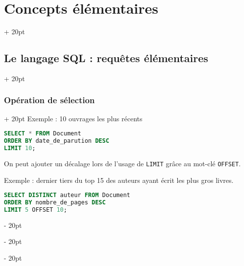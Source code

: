 \documentclass[a4paper, 12pt, twoside]{article}
\newcommand{\ind}[1][20pt]{\advance\leftskip + #1}
\newcommand{\deind}[1][20pt]{\advance\leftskip - #1}
\newenvironment{indt}[2][20pt]{#2 \par \ind[#1]}{\par \deind} %
\begin{document}
\begin{indt}{\section{Concepts élémentaires}}
\begin{indt}{\subsection{Le langage SQL : requêtes élémentaires}}
\begin{indt}{\subsubsection{Opération de sélection}}
                Exemple : 10 ouvrages les plus récents

                \begin{lstlisting}[language=SQL, xleftmargin=80pt]
SELECT * FROM Document
ORDER BY date_de_parution DESC
LIMIT 10;\end{lstlisting}

                On peut ajouter un décalage lors de l'usage de \texttt{LIMIT} grâce au mot-clé \texttt{OFFSET}.

                Exemple : dernier tiers du top 15 des auteurs ayant écrit les plus gros livres.

                \begin{lstlisting}[language=SQL, xleftmargin=80pt]
SELECT DISTINCT auteur FROM Document
ORDER BY nombre_de_pages DESC
LIMIT 5 OFFSET 10;\end{lstlisting}
            \end{indt}
        \end{indt}
        
    \end{indt}

    \vspace{12pt}
    
\end{document}
